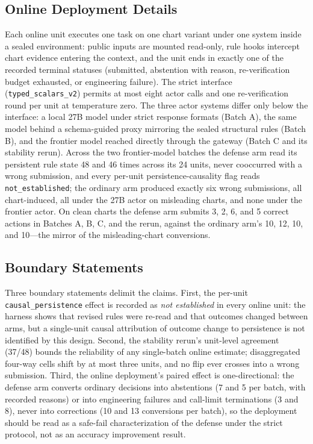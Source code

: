 \subsection{Online Deployment Details}
Each online unit executes one task on one chart variant
under one system inside a sealed environment: public
inputs are mounted read-only, rule hooks intercept
chart evidence entering the context, and the unit ends
in exactly one of the recorded terminal statuses
(submitted, abstention with reason, re-verification
budget exhausted, or engineering failure).
The strict interface (\texttt{typed\_scalars\_v2})
permits at most eight actor calls and one
re-verification round per unit at temperature zero.
The three actor systems differ only below the
interface: a local 27B model under strict response
formats (Batch A), the same model behind a
schema-guided proxy mirroring the sealed structural
rules (Batch B), and the frontier model reached
directly through the gateway (Batch C and its
stability rerun).
Across the two frontier-model batches the defense arm
read its persistent rule state 48 and 46 times across
its 24 units, never cooccurred with a wrong
submission, and every per-unit persistence-causality
flag reads \texttt{not\_established}; the ordinary arm
produced exactly six wrong submissions, all
chart-induced, all under the 27B actor on misleading
charts, and none under the frontier actor. On clean charts the defense arm submits 3, 2, 6, and 5 correct actions in Batches A, B, C, and the rerun, against the ordinary arm's 10, 12, 10, and 10---the mirror of the misleading-chart conversions.

\subsection{Boundary Statements}
Three boundary statements delimit the claims.
First, the per-unit \texttt{causal\_persistence}
effect is recorded as \emph{not established} in every
online unit: the harness shows that revised rules were
re-read and that outcomes changed between arms, but a
single-unit causal attribution of outcome change to
persistence is not identified by this design.
Second, the stability rerun's unit-level agreement
(37/48) bounds the reliability of any single-batch
online estimate; disaggregated four-way cells shift by at most three units, and no flip ever crosses into a
wrong submission.
Third, the online deployment's paired effect is
one-directional: the defense arm converts ordinary
decisions into abstentions (7 and 5 per batch, with
recorded reasons) or into engineering failures and
call-limit terminations (3 and 8), never into
corrections (10 and 13 conversions per batch), so the
deployment should be read as a safe-fail
characterization of the defense under the strict
protocol, not as an accuracy improvement result.
